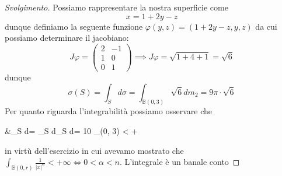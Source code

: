 \begin{proof}[Svolgimento]
	Possiamo rappresentare la nostra superficie come
	$$
	x = 1 + 2y - z
	$$
	dunque definiamo la seguente funzione $\varphi(y, z) = (1+2y-z, y, z)$ da cui possiamo determinare il jacobiano:
	$$
	J\varphi = \begin{pmatrix}
		2 & -1 \\
		1 & 0 \\
		0 & 1
	\end{pmatrix} \implies J\varphi = \sqrt{1 + 4 + 1} = \sqrt{6}
	$$
	dunque
	$$
	\sigma(S) = \int_S d\sigma = \int_{\mathbb{B}(0, 3)} \sqrt{6} dm_2 = 9 \pi \cdot \sqrt{6} 
	$$
	Per quanto riguarda l'integrabilità possiamo osservare che
	\begin{flalign*}
	&\int_S d\sigma = \int_S d\sigma \leq \int_S  d\sigma = 10  \int_{(0, 3)}  < +\infty
	\end{flalign*}
	in virtù dell'esercizio in cui avevamo mostrato che $\int_{\mathbb{B}(0, r)} \frac{1}{|x|^\alpha} < +\infty \iff 0 < \alpha < n$.
	L'integrale è un banale conto
\end{proof}
